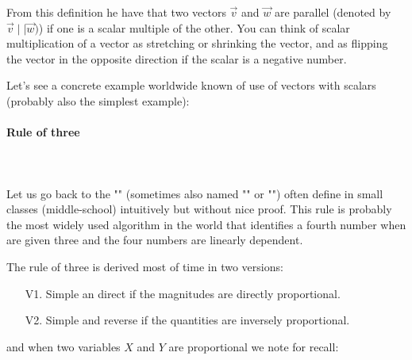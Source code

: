 	From this definition he have that two vectors $\vec{v}$ and $\vec{w}$ are parallel (denoted by $\vec{v}\mid\mid\vec{w})$) if one is a scalar multiple of the other. You can think of scalar multiplication of a vector as stretching or shrinking the vector, and as flipping the vector in the opposite direction if the scalar is a negative number.
	
	
	Let's see a concrete example worldwide known of use of vectors with scalars (probably also the simplest example):
	
	\paragraph{Rule of three}\mbox{}\\\\
	Let us go back to the "" (sometimes also named "" or "") often define in small classes (middle-school) intuitively but without nice proof. This rule is probably the most widely used algorithm in the world that identifies a fourth number when are given three and the four numbers are linearly dependent.

The rule of three is derived most of time in two versions:
	\begin{enumerate}
		\item[V1.] Simple an direct if the magnitudes are directly proportional.
		\item[V2.] Simple and reverse if the quantities are inversely proportional.
	\end{enumerate}
and when two variables $X$ and $Y$ are proportional we note for recall:
	
